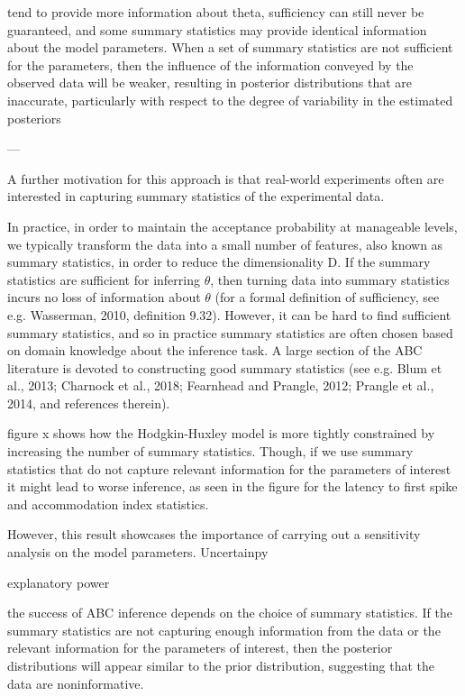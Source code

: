 tend to provide more information about theta, sufficiency can still never be guaranteed, and some summary statistics may provide identical information about the model parameters. When a set of summary statistics are not sufficient for the parameters, then the influence of the information conveyed by the observed data will be weaker, resulting in posterior distributions that are inaccurate, particularly with respect to the degree of variability in the estimated posteriors


---

A further motivation for this approach is that real-world experiments often are interested in capturing summary statistics of the experimental data. 

In practice, in order to maintain the acceptance probability at manageable levels, we typically transform the data into a small number of features, also known as summary statistics, in order to reduce the dimensionality D. If the summary statistics are sufficient for inferring $\theta$, then turning data into summary statistics incurs no loss of information about $\theta$ (for a formal definition of sufficiency, see e.g. Wasserman, 2010, definition 9.32). However, it can be hard to find sufficient summary statistics, and so in practice summary statistics are often chosen based on domain knowledge about the inference task. A large section of the ABC literature is devoted to constructing good summary statistics (see e.g. Blum et al., 2013; Charnock et al., 2018; Fearnhead and Prangle, 2012; Prangle et al., 2014, and references therein).


figure x shows how the Hodgkin-Huxley model is more tightly constrained by increasing the number of summary statistics. Though, if we use summary statistics that do not capture relevant information for the parameters of interest it might lead to worse inference, as seen in the figure for the latency to first spike and accommodation index statistics.  

However, this result showcases the importance of carrying out a sensitivity analysis on the model parameters. Uncertainpy

explanatory power

the success of ABC inference depends on the choice of summary statistics. If the summary statistics are not capturing enough information from the data or the relevant information for the parameters of interest, then the posterior distributions will appear similar to the prior distribution, suggesting that the data are noninformative. 

